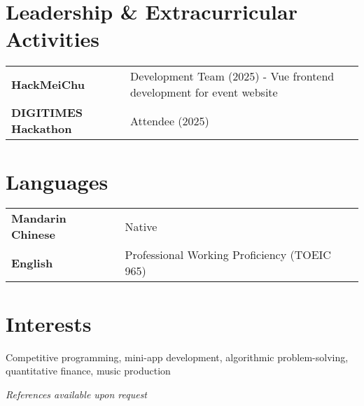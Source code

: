 \documentclass[11pt,a4paper]{article}
\begin{document}
\begin{CJK}{UTF8}{bsmi}
\section{Leadership \& Extracurricular Activities}
\begin{tabularx}{\textwidth}{@{}l X@{}}
    \textbf{HackMeiChu} & Development Team (2025) - Vue frontend development for event website \\[0.2cm]
    \textbf{DIGITIMES Hackathon} & Attendee (2025)
\end{tabularx}

\section{Languages}
\begin{tabularx}{\textwidth}{@{}l X@{}}
    \textbf{Mandarin Chinese} & Native \\[0.2cm]
    \textbf{English} & Professional Working Proficiency (TOEIC 965)
\end{tabularx}

\section{Interests}
Competitive programming, mini-app development, algorithmic problem-solving, quantitative finance, music production

\vspace{0.5cm}
\begin{center}
\textit{\color{dark}References available upon request}
\end{center}

\end{CJK}
\end{document}

